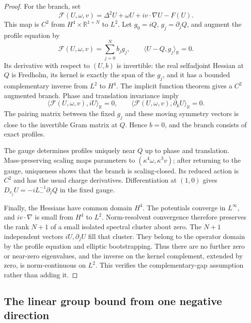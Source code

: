 \begin{proof}
For the branch, set
\[
 \mathcal F(U,\omega,v)=\Delta^2U+\omega U+iv\cdot\nabla U-F(U).
\]
This map is $C^2$ from $H^4\times\mathbb R^{1+N}$ to $L^2$.
Let $g_0=iQ$, $g_j=\partial_jQ$, and augment the profile equation by
\[
 \mathcal F(U,\omega,v)=\sum_{j=0}^N b_jg_j,
 \qquad \langle U-Q,g_j\rangle_{\mathbb R}=0.
\]
Its derivative with respect to $(U,b)$ is invertible: the real
selfadjoint Hessian at $Q$ is Fredholm, its kernel is exactly the
span of the $g_j$, and it has a bounded complementary inverse from
$L^2$ to $H^4$. The implicit function theorem gives a $C^2$ augmented
branch. Phase and translation invariance imply
\[
 \langle\mathcal F(U,\omega,v),iU\rangle_{\mathbb R}=0,
 \qquad
 \langle\mathcal F(U,\omega,v),\partial_kU\rangle_{\mathbb R}=0.
\]
The pairing matrix between the fixed $g_j$ and these moving symmetry
vectors is close to the invertible Gram matrix at $Q$. Hence $b=0$,
and the branch consists of exact profiles.

The gauge determines profiles uniquely near $Q$ up to phase and
translation. Mass-preserving scaling maps parameters to
$(\kappa^4\omega,\kappa^3v)$; after returning to the gauge, uniqueness
shows that the branch is scaling-closed. Its reduced action is $C^2$
and has the usual charge derivatives. Differentiation at $(1,0)$ gives
$D_{v_j}U=-iL_-^{-1}\partial_jQ$ in the fixed gauge.

Finally, the Hessians have common domain $H^4$. The potentials converge
in $L^\infty$, and $iv\cdot\nabla$ is small from $H^4$ to $L^2$.
Norm-resolvent convergence therefore preserves the rank $N+1$ of a
small isolated spectral cluster about zero. The $N+1$ independent
vectors $iU,\partial_jU$ fill that cluster. They belong to the operator
domain by the profile equation and elliptic bootstrapping. Thus there
are no further zero or near-zero eigenvalues, and the inverse on the
kernel complement, extended by zero, is norm-continuous on $L^2$.
This verifies the complementary-gap assumption rather than adding it.
\end{proof}

\subsection{The linear group bound from one negative direction}

